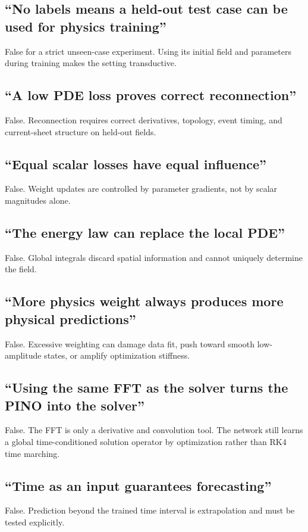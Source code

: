 \documentclass[11pt]{article}
\begin{document}
\subsection{``No labels means a held-out test case can be used for physics training''}
False for a strict unseen-case experiment. Using its initial field and parameters during training makes the setting transductive.

\subsection{``A low PDE loss proves correct reconnection''}
False. Reconnection requires correct derivatives, topology, event timing, and current-sheet structure on held-out fields.

\subsection{``Equal scalar losses have equal influence''}
False. Weight updates are controlled by parameter gradients, not by scalar magnitudes alone.

\subsection{``The energy law can replace the local PDE''}
False. Global integrals discard spatial information and cannot uniquely determine the field.

\subsection{``More physics weight always produces more physical predictions''}
False. Excessive weighting can damage data fit, push toward smooth low-amplitude states, or amplify optimization stiffness.

\subsection{``Using the same FFT as the solver turns the PINO into the solver''}
False. The FFT is only a derivative and convolution tool. The network still learns a global time-conditioned solution operator by optimization rather than RK4 time marching.

\subsection{``Time as an input guarantees forecasting''}
False. Prediction beyond the trained time interval is extrapolation and must be tested explicitly.
\end{document}
